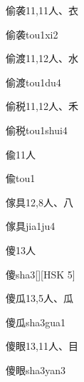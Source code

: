 \begin{entry}{偷袭}{11,11}{⼈、⾐}
  \begin{phonetics}{偷袭}{tou1xi2}
  \end{phonetics}
\end{entry}

\begin{entry}{偷渡}{11,12}{⼈、⽔}
  \begin{phonetics}{偷渡}{tou1du4}
  \end{phonetics}
\end{entry}

\begin{entry}{偷税}{11,12}{⼈、⽲}
  \begin{phonetics}{偷税}{tou1shui4}
  \end{phonetics}
\end{entry}

\begin{entry}{偸}{11}{⼈}
  \begin{phonetics}{偸}{tou1}
  \end{phonetics}
\end{entry}

\begin{entry}{傢具}{12,8}{⼈、⼋}
  \begin{phonetics}{傢具}{jia1ju4}
  \end{phonetics}
\end{entry}

\begin{entry}{傻}{13}{⼈}
  \begin{phonetics}{傻}{sha3}[][HSK 5]
  \end{phonetics}
\end{entry}

\begin{entry}{傻瓜}{13,5}{⼈、⽠}
  \begin{phonetics}{傻瓜}{sha3gua1}
  \end{phonetics}
\end{entry}

\begin{entry}{傻眼}{13,11}{⼈、⽬}
  \begin{phonetics}{傻眼}{sha3yan3}
  \end{phonetics}
\end{entry}

